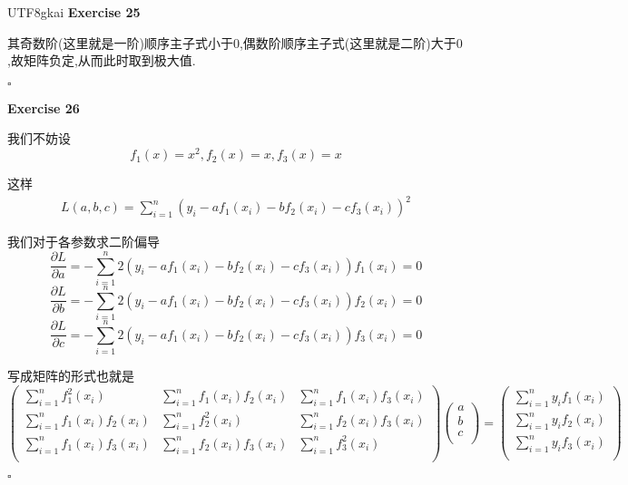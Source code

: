 \documentclass[11pt,hyperref,a4paper,UTF8]{ctexart}
\newenvironment{exercise}[1]{%
{\textbf{Exercise #1} \\ 
    }
}{
  \hfill $\square$ 
  \par\bigskip 
}
\begin{document}
\begin{CJK}{UTF8}{gkai}
\begin{exercise}{25}
    其奇数阶(这里就是一阶)顺序主子式小于$0$,偶数阶顺序主子式(这里就是二阶)大于$0$,故矩阵负定,从而此时取到极大值.
\end{exercise}

\begin{exercise}{26}


    我们不妨设
    \[f_1(x) = x^2,f_2(x) = x,f_3(x) = x\]

    这样
    \[\begin{aligned}
        L(a,b,c) = \sum_{i = 1}^{n}(y_i - a f_1(x_i) - bf_2(x_i) - c f_3(x_i))^2
    \end{aligned}\]


    我们对于各参数求二阶偏导
    \[\frac{\partial L}{\partial a} = - \sum_{i = 1}^{n} 2(y_i - a f_1(x_i) - bf_2(x_i) - c f_3(x_i)) f_1(x_i) = 0\]
    \[\frac{\partial L}{\partial b} = - \sum_{i = 1}^{n} 2(y_i - a f_1(x_i) - bf_2(x_i) - c f_3(x_i)) f_2(x_i) = 0\]
    \[\frac{\partial L}{\partial c} = - \sum_{i = 1}^{n} 2(y_i - a f_1(x_i) - bf_2(x_i) - c f_3(x_i)) f_3(x_i) = 0\]

    写成矩阵的形式也就是
    \[
    \begin{pmatrix}
        \sum_{i = 1}^{n} f_1^2(x_i)&\sum_{i = 1}^{n} f_1(x_i) f_2(x_i)&\sum_{i = 1}^{n} f_1(x_i) f_3(x_i)\\
        \sum_{i = 1}^{n} f_1(x_i) f_2(x_i)&\sum_{i = 1}^{n} f_2^2(x_i)&\sum_{i = 1}^{n} f_2(x_i) f_3(x_i)\\
        \sum_{i = 1}^{n} f_1(x_i) f_3(x_i)&\sum_{i = 1}^{n} f_2(x_i) f_3(x_i)&\sum_{i = 1}^{n} f_3^2(x_i)\\
    \end{pmatrix}    
    \begin{pmatrix}
        a\\
        b\\
        c\\
    \end{pmatrix}
    =
    \begin{pmatrix}
        \sum_{i = 1}^{n}y_i f_1(x_i)\\
        \sum_{i = 1}^{n}y_i f_2(x_i)\\
        \sum_{i = 1}^{n}y_i f_3(x_i)\\
    \end{pmatrix}\]


\end{exercise}
\end{CJK}
\end{document}
